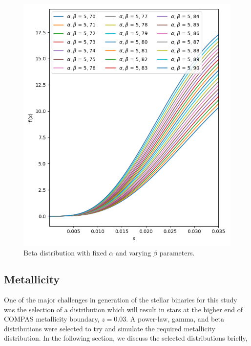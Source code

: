 \begin{figure}[!ht]%
    \centering
    \includegraphics[width=\linewidth]{images/beta2}
    \caption{Beta distribution with fixed $\alpha$ and varying $\beta$ parameters.}
    \label{fig:beta2}
\end{figure}%

\subsection{\textbf{Metallicity}}
\label{subsec:metallicity}
One of the major challenges in generation of the stellar binaries for this study was the selection of a distribution which will result in stars at the higher end of COMPAS metallicity boundary, $z = 0.03$.
A power-law, gamma, and beta distributions were selected to try and simulate the required metallicity distribution.
In the following section, we discuss the selected distributions briefly,